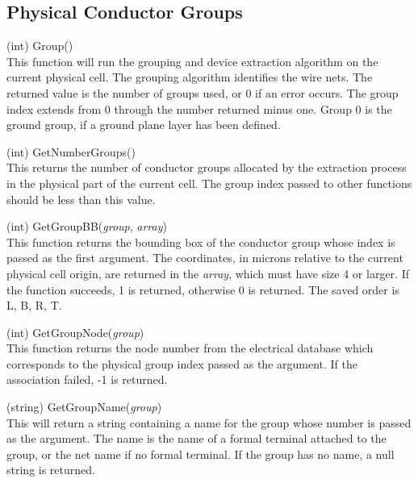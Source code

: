 \subsection{Physical Conductor Groups}

\begin{description}
\item{(int) \vt Group()}\\
This function will run the grouping and device extraction algorithm on
the current physical cell.  The grouping algorithm identifies the wire
nets.  The returned value is the number of groups used, or 0 if an
error occurs.  The group index extends from 0 through the number
returned minus one.  Group 0 is the ground group, if a ground plane
layer has been defined.

\item{(int) \vt GetNumberGroups()}\\
This returns the number of conductor groups allocated by the
extraction process in the physical part of the current cell.  The
group index passed to other functions should be less than this value.

\item{(int) \vt GetGroupBB({\it group}, {\it array\/})}\\
This function returns the bounding box of the conductor group whose
index is passed as the first argument.  The coordinates, in microns
relative to the current physical cell origin, are returned in the
{\it array}, which must have size 4 or larger.  If the function
succeeds, 1 is returned, otherwise 0 is returned.  The saved order is
L, B, R, T.

\item{(int) \vt GetGroupNode({\it group\/})}\\
This function returns the node number from the electrical database
which corresponds to the physical group index passed as the argument. 
If the association failed, -1 is returned.

\item{(string) \vt GetGroupName({\it group\/})}\\
This will return a string containing a name for the group whose number
is passed as the argument.  The name is the name of a formal terminal
attached to the group, or the net name if no formal terminal.  If the
group has no name, a null string is returned.


\end{description}
